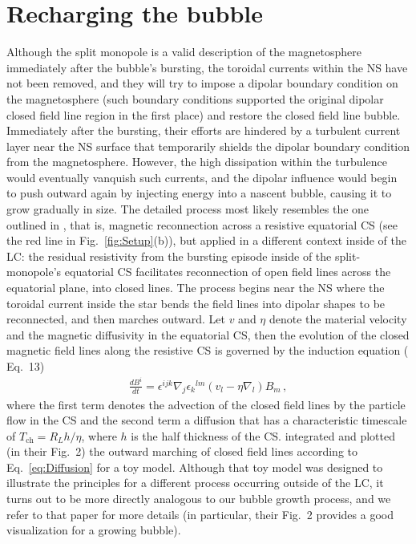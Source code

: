 \documentclass{aa}
\newcommand{\bea}{\begin{eqnarray}}
\newcommand{\eea}{\end{eqnarray}}
\begin{document}
\section{Recharging the bubble} \label{sec:recharge}
Although the split monopole is a valid description of the magnetosphere immediately after the bubble's bursting, the toroidal currents within the NS have not been removed, and they will try to impose a dipolar boundary condition on the magnetosphere (such boundary conditions supported the original dipolar closed field line region in the first place) and restore the closed field line bubble. Immediately after the bursting, their efforts are hindered by a turbulent current layer near the NS surface that temporarily shields the dipolar boundary condition from the magnetosphere. However, the high dissipation within the turbulence would eventually vanquish such currents, and the dipolar influence would begin to push outward again by injecting energy into a nascent bubble, causing it to grow gradually in size. The detailed process most
likely resembles the one outlined in \cite{2007A&A...466..301C}, that is, magnetic reconnection across a resistive equatorial CS (see the red line in Fig.~\ref{fig:Setup}(b)), but applied in a different context inside of the LC: the residual resistivity from the bursting episode inside of the split-monopole's equatorial CS facilitates reconnection of open field lines across the equatorial plane, into closed lines. The process begins near the NS where the toroidal current inside the star bends the field lines into dipolar shapes to be reconnected, and then marches outward. Let $v$ and $\eta$ denote the material velocity and the magnetic diffusivity in the equatorial CS, then the evolution of the closed magnetic field lines along the resistive CS is governed by the induction equation (\cite{2007A&A...466..301C} Eq.~13)
\bea \label{eq:Diffusion}
\frac{dB^i}{dt}=\epsilon^{ijk}\nabla_j\epsilon_k{}^{lm}(v_l - \eta \nabla_l) B_m \,,
\eea
where the first term denotes the advection of the closed field lines by the particle flow in the CS and the second term a diffusion that has a characteristic timescale of $T_{\text{ch}}=R_{L} h/\eta$, where $h$ is the half thickness of the CS. 
\cite{2007A&A...466..301C} integrated and plotted (in their Fig.~2) the outward marching of closed field lines according to Eq.~\eqref{eq:Diffusion} for a toy model. Although that toy model was designed to illustrate the principles for a different process occurring outside of the LC, it turns out to be more directly analogous to our bubble growth process, and we refer to that paper for more details (in particular, their Fig.~2 provides a good visualization for a growing bubble). 
\end{document}
